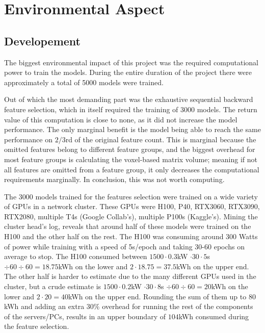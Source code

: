 \section{Environmental Aspect}

\subsection{Developement}

The biggest environmental impact of this project was the required computational power to train the models. During the entire duration of the project there were approximately a total of 5000 models were trained.\par
Out of which the most demanding part was the exhaustive sequential backward feature selection, which in itself required the training of 3000 models. The return value of this computation is close to none, as it did not increase the model performance. The only marginal benefit is the model being able to reach the same performance on $2/3$rd of the original feature count. This is marginal because the omitted features belong to different feature groups, and the biggest overhead for most feature groups is calculating the voxel-based matrix volume; meaning if not all features are omitted from a feature group, it only decreases the computational requirements marginally. In conclusion, this was not worth computing.\par
The 3000 models trained for the features selection were trained on a wide variety of GPUs in a network cluster. These GPUs were H100, P40, RTX3060, RTX3090, RTX2080, multiple T4s (Google Collab's), multiple P100s (Kaggle's). Mining the cluster head's log, reveals that around half of these models were trained on the H100 and the other half on the rest. The H100 was consuming around 300 Watts of power while training with a speed of 5s/epoch and taking 30-60 epochs on average to stop. The H100 consumed between $1500 \cdot 0.3$kW $ \cdot 30 \cdot 5$s $ \div 60 \div 60 = 18.75$kWh on the lower and $2 \cdot 18.75 = 37.5$kWh on the upper end. The other half is harder to estimate due to the many different GPUs used in the cluster, but a crude estimate is $1500 \cdot 0.2$kW $ \cdot 30 \cdot 8$s $ \div 60 \div 60 = 20$kWh on the lower and $2 \cdot 20 = 40$kWh on the upper end. Rounding the sum of them up to $80$kWh and adding an extra $30\%$ overhead for running the rest of the components of the servers/PCs, results in an upper boundary of $104$kWh consumed during the feature selection.\par
